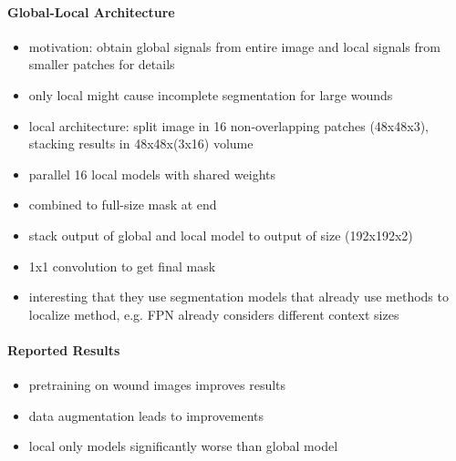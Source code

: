 \paragraph{Global-Local Architecture}

\begin{itemize}
	\item motivation: obtain global signals from entire image and local signals from smaller patches for details
	\item only local might cause incomplete segmentation for large wounds
	\item local architecture: split image in 16 non-overlapping patches (48x48x3), stacking results in 48x48x(3x16) volume
	\item parallel 16 local models with shared weights
	\item combined to full-size mask at end
	\item stack output of global and local model to output of size (192x192x2)
	\item 1x1 convolution to get final mask
\end{itemize}

\begin{itemize}
	\item interesting that they use segmentation models that already use methods to localize method, e.g. FPN already considers different context sizes
\end{itemize}


\paragraph{Reported Results}

\begin{itemize}
	\item pretraining on wound images improves results
	\item data augmentation leads to improvements
	\item local only models significantly worse than global model
\end{itemize}



